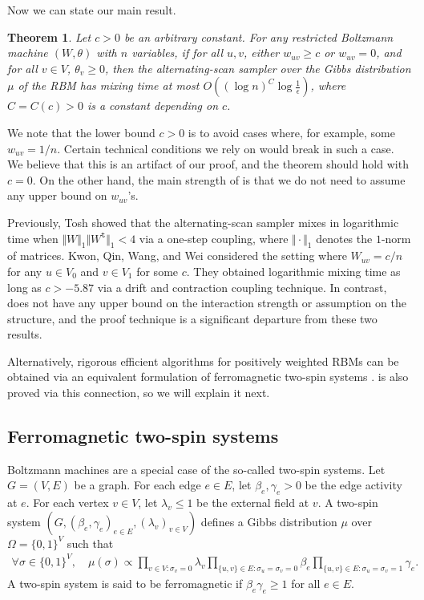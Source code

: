 \documentclass[11pt]{amsart}
\newcommand{\norm}[2]{\ensuremath{\Vert #2 \Vert_{#1}}}
\newtheorem{theorem}{Theorem}
\theoremstyle{definition}
\theoremstyle{remark}
\begin{document}
Now we can state our main result.

\begin{theorem}\label{thm:alternating-scan-mixing-BM}
  Let $c > 0$ be an arbitrary constant. 
  For any restricted Boltzmann machine $(W,\theta)$ with $n$ variables, 
  if for all $u,v$, either $w_{uv} \geq c$ or $w_{uv}=0$, and for all $v \in V$, $\theta_v \ge 0$, 
  then the alternating-scan sampler over the Gibbs distribution $\mu$ of the RBM has mixing time at most $O((\log n)^{C} \log \frac{1}{\epsilon})$, where $C = C(c) > 0$ is a constant depending on $c$.
\end{theorem}

We note that the lower bound $c>0$ is to avoid cases where, for example, some $w_{uv}=1/n$.
Certain technical conditions we rely on would break in such a case.
We believe that this is an artifact of our proof, and the theorem should hold with $c=0$.
On the other hand, the main strength of  is that we do not need to assume any upper bound on $w_{uv}$'s.

Previously, Tosh \cite{Tos16} showed that the alternating-scan sampler mixes in logarithmic time when $\norm{1}{W}\norm{1}{W^{\texttt{t}}}< 4$ via a one-step coupling,
where $\norm{1}{\cdot}$ denotes the $1$-norm of matrices.
Kwon, Qin, Wang, and Wei \cite{KQWW26} considered the setting where $W_{uv}=c/n$ for any $u\in V_0$ and $v\in V_1$ for some $c$.
They obtained logarithmic mixing time as long as $c>-5.87$ via a drift and contraction coupling technique.
In contrast,  does not have any upper bound on the interaction strength or assumption on the structure, and the proof technique is a significant departure from these two results.

Alternatively, rigorous efficient algorithms for positively weighted RBMs can be obtained via an equivalent formulation of ferromagnetic two-spin systems \cite{GoldbergJP03,LiuLZ14,GuoL18,GLL20}.
 is also proved via this connection, so we will explain it next.

\subsection{Ferromagnetic two-spin systems}

Boltzmann machines are a special case of the so-called two-spin systems.
Let $G=(V,E)$ be a graph. 
For each edge $e \in E$, let $\beta_e,\gamma_e > 0$ be the edge activity at $e$.
For each vertex $v \in V$, let $\lambda_v \leq 1$ be the external field at $v$.
A two-spin system $(G,(\beta_e,\gamma_e)_{e \in E},(\lambda_v)_{v \in V})$ defines a Gibbs distribution $\mu$ over $\Omega =\{0,1\}^V$ such that 
\begin{align*}
    \forall \sigma \in \{0,1\}^V,\quad \mu(\sigma) \propto \prod_{v \in V: \sigma_v = 0}\lambda_v \prod_{\{u,v\}\in E: \sigma_u = \sigma_v = 0} \beta_e \prod_{\{u,v\}\in E: \sigma_u = \sigma_v = 1} \gamma_e.
\end{align*} A two-spin system is said to be ferromagnetic if $\beta_e\gamma_e \ge 1$ for all $e \in E$.
\end{document}
